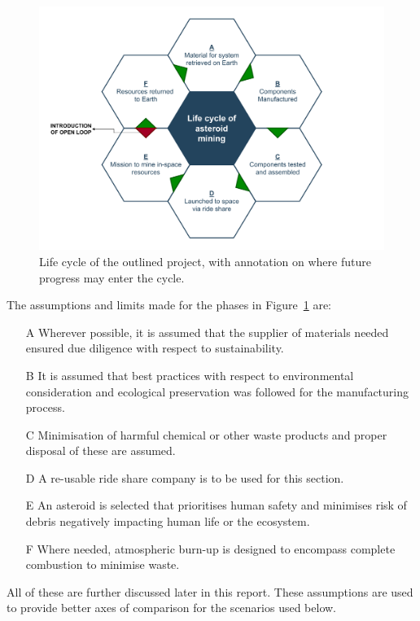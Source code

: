 \documentclass[conference]{IEEEtran}
\begin{document}
\begin{figure}[H]
\centering
\includegraphics[width=\linewidth]{lca.pdf}
\caption{\label{fig:lca}Life cycle of the outlined project, with annotation on where future progress may enter the cycle.}
\end{figure}

The assumptions and limits made for the phases in Figure~\ref{fig:lca} are:
\begin{itemize}
    \item[A] Wherever possible, it is assumed that the supplier of materials needed ensured due diligence with respect to sustainability.
    \item[B] It is assumed that best practices with respect to environmental consideration and ecological preservation was followed for the manufacturing process.
    \item[C] Minimisation of harmful chemical or other waste products and proper disposal of these are assumed.
    \item[D] A re-usable ride share company is to be used for this section.
    \item[E] An asteroid is selected that prioritises human safety and minimises risk of debris negatively impacting human life or the ecosystem.
    \item[F] Where needed, atmospheric burn-up is designed to encompass complete combustion to minimise waste.
    
\end{itemize}

All of these are further discussed later in this report. These assumptions are used to provide better axes of comparison for the scenarios used below.
\end{document}
